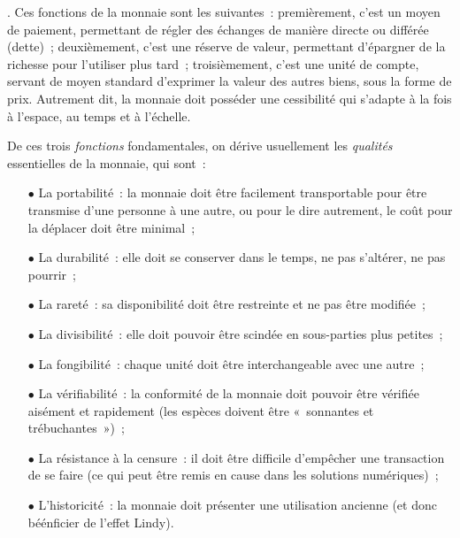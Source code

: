 {\begin{quote}
\end{quote}}. Ces fonctions de la monnaie sont les suivantes~: premièrement, c'est un moyen de paiement, permettant de régler des échanges de manière directe ou différée (dette)~; deuxièmement, c'est une réserve de valeur, permettant d'épargner de la richesse pour l'utiliser plus tard~; troisièmement, c'est une unité de compte, servant de moyen standard d'exprimer la valeur des autres biens, sous la forme de prix. Autrement dit, la monnaie doit posséder une cessibilité qui s'adapte à la fois à l'espace, au temps et à l'échelle.

De ces trois \emph{fonctions} fondamentales, on dérive usuellement les \emph{qualités} essentielles de la monnaie, qui sont~:

\begin{itemize}
\item[$\bullet$] La portabilité~: la monnaie doit être facilement transportable pour être transmise d'une personne à une autre, ou pour le dire autrement, le coût pour la déplacer doit être minimal~;
\item[$\bullet$] La durabilité~: elle doit se conserver dans le temps, ne pas s'altérer, ne pas pourrir~;
\item[$\bullet$] La rareté~: sa disponibilité doit être restreinte et ne pas être modifiée~;
\item[$\bullet$] La divisibilité~: elle doit pouvoir être scindée en sous-parties plus petites~;
\item[$\bullet$] La fongibilité~: chaque unité doit être interchangeable avec une autre~;
\item[$\bullet$] La vérifiabilité~: la conformité de la monnaie doit pouvoir être vérifiée aisément et rapidement (les espèces doivent être «~sonnantes et trébuchantes~»)~;
\item[$\bullet$] La résistance à la censure~: il doit être difficile d'empêcher une transaction de se faire (ce qui peut être remis en cause dans les solutions numériques)~;
\item[$\bullet$] L'historicité~: la monnaie doit présenter une utilisation ancienne (et donc béénficier de l'effet Lindy).
\end{itemize}

